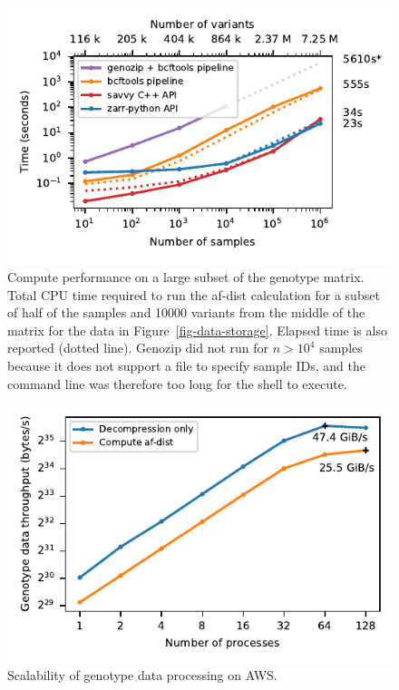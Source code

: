 \documentclass[a4paper,num-refs]{oup-contemporary}
\begin{document}
\begin{figure}[h]
\includegraphics{figures/subset-matrix-compute-supplemental}
\caption{Compute performance on a large subset of the genotype matrix.
Total CPU time required to run the af-dist calculation for
a subset of half of the samples and 10000 variants from the middle of the matrix
for the data in Figure~\ref{fig-data-storage}.
Elapsed time is also reported (dotted line). 
Genozip did not run for
$n > 10^4$ samples because it does not support a file to specify
sample IDs, and the command line was therefore too long for the shell
to execute. 
\label{fig-subset-matrix-compute-supplemental}}
\end{figure}

\begin{figure}[h]
\includegraphics{figures/s3-throughput}
\caption{Scalability of genotype data processing on AWS.
\label{fig-s3-throughput}}
\end{figure}
\end{document}
